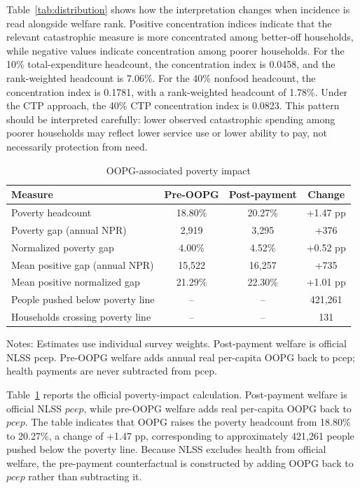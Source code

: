 \documentclass[11pt]{article}
\begin{document}
Table~\ref{tab:distribution} shows how the interpretation changes when incidence is read alongside welfare rank. Positive concentration indices indicate that the relevant catastrophic measure is more concentrated among better-off households, while negative values indicate concentration among poorer households. For the 10\% total-expenditure headcount, the concentration index is 0.0458, and the rank-weighted headcount is 7.06\%. For the 40\% nonfood headcount, the concentration index is 0.1781, with a rank-weighted headcount of 1.78\%. Under the CTP approach, the 40\% CTP concentration index is 0.0823. This pattern should be interpreted carefully: lower observed catastrophic spending among poorer households may reflect lower service use or lower ability to pay, not necessarily protection from need.

\begin{table}[!htbp]
\centering
\begin{threeparttable}
\caption{OOPG-associated poverty impact}
\label{tab:poverty}
\small
\begin{tabular}{lccc}
\toprule
Measure & Pre-OOPG & Post-payment & Change \\
\midrule
Poverty headcount & 18.80\% & 20.27\% & +1.47 pp \\
Poverty gap (annual NPR) & 2,919 & 3,295 & +376 \\
Normalized poverty gap & 4.00\% & 4.52\% & +0.52 pp \\
Mean positive gap (annual NPR) & 15,522 & 16,257 & +735 \\
Mean positive normalized gap & 21.29\% & 22.30\% & +1.01 pp \\
\addlinespace
People pushed below poverty line & -- & -- & 421,261 \\
Households crossing poverty line & -- & -- & 131 \\
\bottomrule
\end{tabular}
\begin{tablenotes}
\small
\item Notes: Estimates use individual survey weights. Post-payment welfare is official NLSS pcep. Pre-OOPG welfare adds annual real per-capita OOPG back to pcep; health payments are never subtracted from pcep.
\end{tablenotes}
\end{threeparttable}
\end{table}

Table~\ref{tab:poverty} reports the official poverty-impact calculation. Post-payment welfare is official NLSS $pcep$, while pre-OOPG welfare adds real per-capita OOPG back to $pcep$. The table indicates that OOPG raises the poverty headcount from 18.80\% to 20.27\%, a change of +1.47 pp, corresponding to approximately 421,261 people pushed below the poverty line. Because NLSS excludes health from official welfare, the pre-payment counterfactual is constructed by adding OOPG back to $pcep$ rather than subtracting it.
\end{document}
